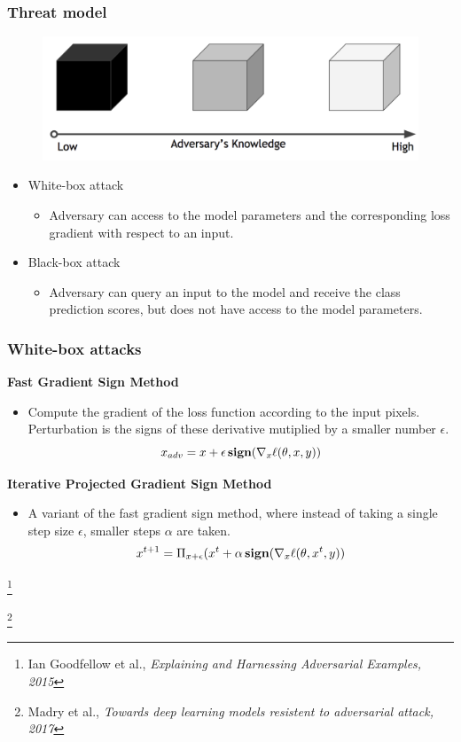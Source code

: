 \documentclass[10pt,mathserif]{beamer}
\newcommand\blfootnote[1]{%
  \begingroup
  \renewcommand\thefootnote{}\footnote{#1}%
  \addtocounter{footnote}{-1}%
  \endgroup
}
\begin{document}
\begin{frame}
\frametitle{Threat model}
\begin{figure}
    \centering
    \includegraphics[scale=0.15]{figures/threat_model.png}
    \label{fig:adversarial_attack}
\end{figure}\pause
\begin{itemize}\itemsep=12pt
    \item White-box attack
    \begin{itemize}
        \item Adversary can access to the model parameters and the corresponding loss gradient with respect to an input.
    \end{itemize}\pause
    \item Black-box attack
    \begin{itemize}
        \item Adversary can query an input to the model and receive the class prediction scores, but does not have access to the model parameters.
    \end{itemize}
\end{itemize}
\end{frame}
 

\begin{frame}
\frametitle{White-box attacks}
\textbf{Fast Gradient Sign Method}
\vspace{0.5em}
\begin{itemize}
    \item Compute the gradient of the loss function according to the input pixels. Perturbation is the signs of these derivative mutiplied by a smaller number $\epsilon$.
    \[x_{adv} = x + \epsilon \mathop{\bf sign} (\nabla_x \ell(\theta, x, y))\]
\end{itemize}\pause

\vspace{1em}
    
\textbf{Iterative Projected Gradient Sign Method}
\vspace{0.5em}
\begin{itemize}
    \item A variant of the fast gradient sign method, where instead of taking a single step size $\epsilon$, smaller steps $\alpha$ are taken.
    \[x^{t+1} = \Pi_{x+\epsilon}(x^t+\alpha \mathop{\bf sign} (\nabla_x \ell(\theta, x^t, y))\]
\end{itemize}

\blfootnote{\scriptsize Ian Goodfellow et al., \textit{Explaining and Harnessing Adversarial Examples, 2015}}
\blfootnote{\scriptsize Madry et al., \textit{Towards deep learning models resistent to adversarial attack, 2017}}
\end{frame}
\end{document}
